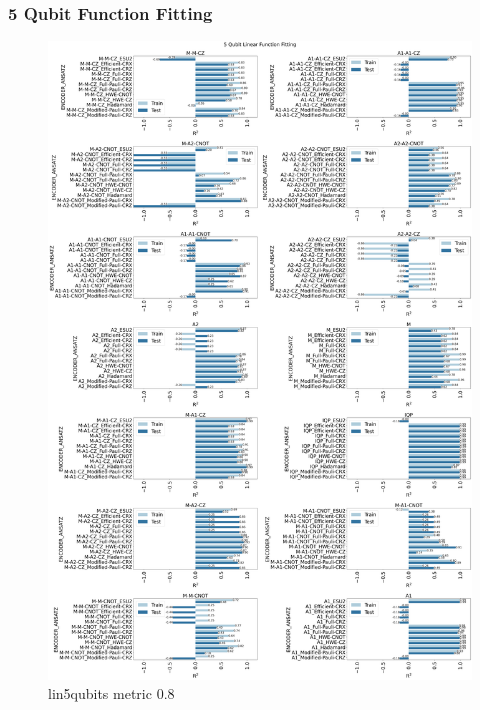 \documentclass[journal=jacsat,manuscript=article]{achemso}
\begin{document}
\subsubsection{5 Qubit Function Fitting}
\begin{figure}[H]
	\centering
	\includegraphics[width=0.8\linewidth]{images/5qubit_Linear_funcfit_R2.png}
	\caption{lin5qubits metric 0.8}
	\label{fig:lin5qubits_metric}
\end{figure}
\end{document}
